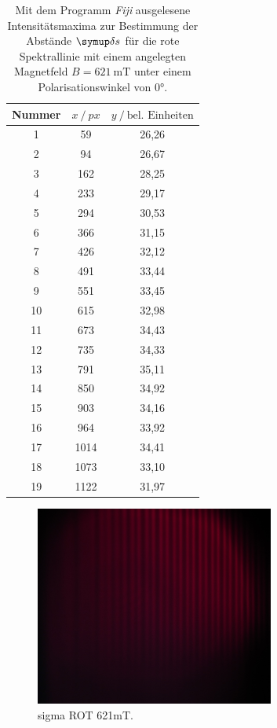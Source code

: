 \begin{table}[H]
  \centering
  \caption{Mit dem Programm \textit{Fiji} \cite{Fiji} ausgelesene Intensitätsmaxima zur Bestimmung der Abstände $\deltaup s$ für die rote Spektrallinie mit einem angelegten Magnetfeld $B=\SI{621}{\milli\tesla}$  unter einem Polarisationswinkel von $0°$.}
  \label{tab:277-Max}
  \begin{tabular}{c|cc}
    \toprule
    {Nummer} & {$x \:/\: \si{px}$} & {$y \:/\: \text{bel. Einheiten}$}\\
    \midrule
 1 &   59  &	 26,26 \\
 2 &   94  &	 26,67 \\
 3 &  162  &	 28,25 \\
 4 &  233  &	 29,17 \\
 5 &  294  &	 30,53 \\
 6 &  366  &	 31,15 \\
 7 &  426  &	 32,12 \\
 8 &  491  &	 33,44 \\
 9 &  551  &  33,45 \\
10 &  615  &	 32,98 \\
11 &  673  &	 34,43 \\
12 &  735  &	 34,33 \\
13 &  791  &	 35,11 \\
14 &  850  &	 34,92 \\
15 &  903  &	 34,16 \\
16 &  964  &	 33,92 \\
17 & 1014  &	 34,41 \\
18 & 1073  &	 33,10 \\
19 & 1122  &	 31,97 \\
  \end{tabular}
\end{table}
\begin{figure}
  \centering
  \includegraphics[width=0.7\textwidth]{bilder/2995_ROT_621mT_sigma.jpg}
  \caption{sigma ROT 621mT.}
  \label{abb:sigmarot621mT}
\end{figure}
